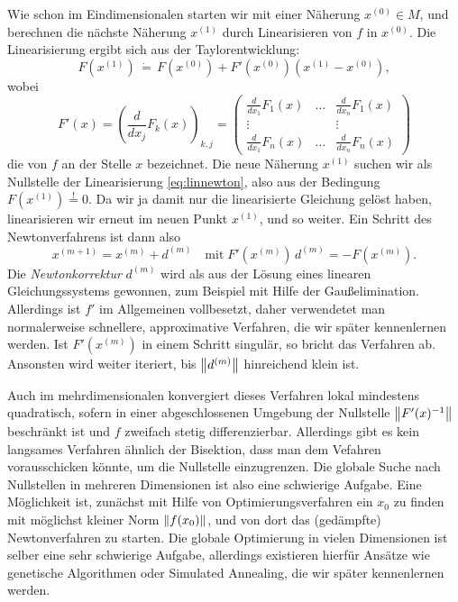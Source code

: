 Wie schon im Eindimensionalen starten wir mit einer Näherung
$x^{(0)}\in M$, und berechnen die nächste Näherung $x^{(1)}$ durch
Linearisieren von $f$ in $x^{(0)}$. Die Linearisierung ergibt sich aus
der Taylorentwicklung:
\begin{equation}
  \label{eq:linnewton}
  F(x^{(1)}) \,\dot{=}\, F(x^{(0)}) +
  F'(x^{(0)})\left(x^{(1)}-x^{(0)}\right),
\end{equation}
wobei
\begin{equation}
  F'(x) = \left(\frac{d}{dx_j}F_k(x)\right)_{k,j} = 
  \begin{pmatrix}
    \frac{d}{dx_1}F_1(x) & \ldots & \frac{d}{dx_n}F_1(x)\\
    \vdots               &        & \vdots \\
    \frac{d}{dx_1}F_n(x) & \ldots & \frac{d}{dx_n}F_n(x)
  \end{pmatrix}
\end{equation}
die \emph{} von $f$ an der Stelle $x$ bezeichnet.
Die neue Näherung $x^{(1)}$ suchen wir als Nullstelle der
Linearisierung \eqref{eq:linnewton}, also aus der Bedingung
$F(x^{(1)})\stackrel{!}{=} 0$. Da wir ja damit nur die
linearisierte Gleichung gelöst haben, linearisieren wir erneut im
neuen Punkt $x^{(1)}$, und so weiter. Ein Schritt des Newtonverfahrens
ist dann also
\begin{equation}
  x^{(m+1)} = x^{(m)} + d^{(m)}\quad\text{mit}\;
  F'(x^{(m)})\,d^{(m)} = -F(x^{(m)}).
\end{equation}
Die \emph{Newtonkorrektur} $d^{(m)}$ wird als aus der Lösung eines
linearen Gleichungssystems gewonnen, zum Beispiel mit Hilfe der
Gaußelimination. Allerdings ist $f'$ im Allgemeinen vollbesetzt, daher
verwendetet man normalerweise schnellere, approximative Verfahren, die
wir später kennenlernen werden. Ist $F'(x^{(m)})$ in einem Schritt
singulär, so bricht das Verfahren ab. Ansonsten wird weiter iteriert,
bis $\left\lVert{d^{(m)}}\right\rVert$ hinreichend klein ist.

Auch im mehrdimensionalen konvergiert dieses Verfahren lokal
mindestens quadratisch, sofern in einer abgeschlossenen Umgebung der
Nullstelle $\left\lVert{F'(x)^{-1}}\right\rVert$ beschränkt ist und $f$ zweifach stetig
differenzierbar. Allerdings gibt es kein langsames Verfahren ähnlich
der Bisektion, dass man dem Vefahren vorausschicken könnte, um die
Nullstelle einzugrenzen. Die globale Suche nach Nullstellen in
mehreren Dimensionen ist also eine schwierige Aufgabe. Eine
Möglichkeit ist, zunächst mit Hilfe von Optimierungsverfahren ein
$x_0$ zu finden mit möglichst kleiner Norm $\left\lVert{f(x_0)}\right\rVert$, und von
dort das (gedämpfte) Newtonverfahren zu starten. Die globale
Optimierung in vielen Dimensionen ist selber eine sehr schwierige
Aufgabe, allerdings existieren hierfür Ansätze wie genetische
Algorithmen oder Simulated Annealing, die wir später kennenlernen
werden.

